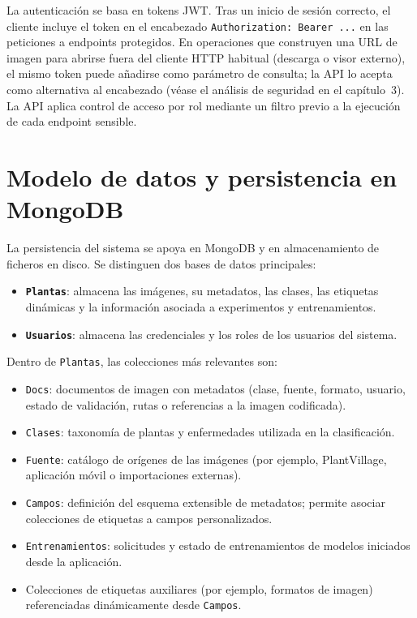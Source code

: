 \documentclass[11pt,spanish,listoffigures,listoftables]{tfgetsinf}
\begin{document}
La autenticación se basa en tokens JWT. Tras un inicio de sesión correcto, el cliente incluye el token en el encabezado \texttt{Authorization: Bearer ...} en las peticiones a endpoints protegidos. En operaciones que construyen una URL de imagen para abrirse fuera del cliente HTTP habitual (descarga o visor externo), el mismo token puede añadirse como parámetro de consulta; la API lo acepta como alternativa al encabezado (véase el análisis de seguridad en el capítulo~3). La API aplica control de acceso por rol mediante un filtro previo a la ejecución de cada endpoint sensible.

\section{Modelo de datos y persistencia en MongoDB}

La persistencia del sistema se apoya en MongoDB y en almacenamiento de ficheros en disco. Se distinguen dos bases de datos principales:

\begin{itemize}
    \item \textbf{\texttt{Plantas}}: almacena las imágenes, su metadatos, las clases, las etiquetas dinámicas y la información asociada a experimentos y entrenamientos.
    \item \textbf{\texttt{Usuarios}}: almacena las credenciales y los roles de los usuarios del sistema.
\end{itemize}

Dentro de \texttt{Plantas}, las colecciones más relevantes son:

\begin{itemize}
    \item \texttt{Docs}: documentos de imagen con metadatos (clase, fuente, formato, usuario, estado de validación, rutas o referencias a la imagen codificada).
    \item \texttt{Clases}: taxonomía de plantas y enfermedades utilizada en la clasificación.
    \item \texttt{Fuente}: catálogo de orígenes de las imágenes (por ejemplo, PlantVillage, aplicación móvil o importaciones externas).
    \item \texttt{Campos}: definición del esquema extensible de metadatos; permite asociar colecciones de etiquetas a campos personalizados.
    \item \texttt{Entrenamientos}: solicitudes y estado de entrenamientos de modelos iniciados desde la aplicación.
    \item Colecciones de etiquetas auxiliares (por ejemplo, formatos de imagen) referenciadas dinámicamente desde \texttt{Campos}.
\end{itemize}
\end{document}
